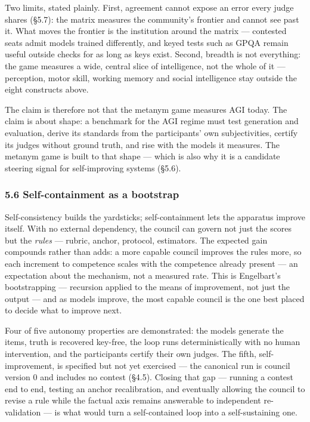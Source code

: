 Two limits, stated plainly. First, agreement cannot expose an error every judge shares (§5.7): the matrix measures the community's frontier and cannot see past it. What moves the frontier is the institution around the matrix --- contested seats admit models trained differently, and keyed tests such as GPQA remain useful outside checks for as long as keys exist. Second, breadth is not everything: the game measures a wide, central slice of intelligence, not the whole of it --- perception, motor skill, working memory and social intelligence stay outside the eight constructs above.

The claim is therefore not that the metanym game measures AGI today. The claim is about shape: a benchmark for the AGI regime must test generation and evaluation, derive its standards from the participants' own subjectivities, certify its judges without ground truth, and rise with the models it measures. The metanym game is built to that shape --- which is also why it is a candidate steering signal for self-improving systems (§5.6).

\subsubsection{5.6 Self-containment as a bootstrap}\label{self-containment-as-a-bootstrap}

Self-consistency builds the yardsticks; self-containment lets the apparatus improve itself. With no external dependency, the council can govern not just the scores but the \emph{rules} --- rubric, anchor, protocol, estimators. The expected gain compounds rather than adds: a more capable council improves the rules more, so each increment to competence scales with the competence already present --- an expectation about the mechanism, not a measured rate. This is Engelbart's bootstrapping --- recursion applied to the means of improvement, not just the output --- and as models improve, the most capable council is the one best placed to decide what to improve next.

Four of five autonomy properties are demonstrated: the models generate the items, truth is recovered key-free, the loop runs deterministically with no human intervention, and the participants certify their own judges. The fifth, self-improvement, is specified but not yet exercised --- the canonical run is council version 0 and includes no contest (§4.5). Closing that gap --- running a contest end to end, testing an anchor recalibration, and eventually allowing the council to revise a rule while the factual axis remains answerable to independent re-validation --- is what would turn a self-contained loop into a self-sustaining one.

